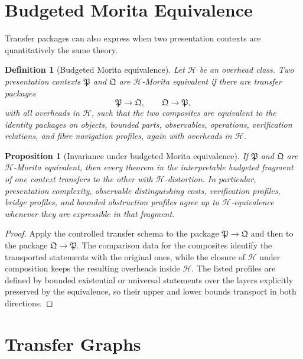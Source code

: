 \documentclass[11pt]{article}
\newtheorem{proposition}[theorem]{Proposition}
\newtheorem{definition}[theorem]{Definition}
\begin{document}
\section{Budgeted Morita Equivalence}

Transfer packages can also express when two presentation contexts are quantitatively the same theory.

\begin{definition}[Budgeted Morita equivalence]
Let \(\mathcal H\) be an overhead class. Two presentation contexts \(\mathfrak P\) and \(\mathfrak Q\) are \(\mathcal H\)-Morita equivalent if there are transfer packages
\[
\mathfrak P\longrightarrow\mathfrak Q,
\qquad
\mathfrak Q\longrightarrow\mathfrak P,
\]
with all overheads in \(\mathcal H\), such that the two composites are equivalent to the identity packages on objects, bounded parts, observables, operations, verification relations, and fibre navigation profiles, again with overheads in \(\mathcal H\).
\end{definition}

\begin{proposition}[Invariance under budgeted Morita equivalence]
If \(\mathfrak P\) and \(\mathfrak Q\) are \(\mathcal H\)-Morita equivalent, then every theorem in the interpretable budgeted fragment of one context transfers to the other with \(\mathcal H\)-distortion. In particular, presentation complexity, observable distinguishing costs, verification profiles, bridge profiles, and bounded obstruction profiles agree up to \(\mathcal H\)-equivalence whenever they are expressible in that fragment.
\end{proposition}

\begin{proof}
Apply the controlled transfer schema to the package \(\mathfrak P\to\mathfrak Q\) and then to the package \(\mathfrak Q\to\mathfrak P\). The comparison data for the composites identify the transported statements with the original ones, while the closure of \(\mathcal H\) under composition keeps the resulting overheads inside \(\mathcal H\). The listed profiles are defined by bounded existential or universal statements over the layers explicitly preserved by the equivalence, so their upper and lower bounds transport in both directions.
\end{proof}

\section{Transfer Graphs}
\end{document}
